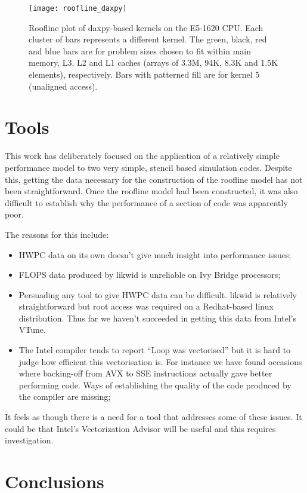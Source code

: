 \documentclass[12pt]{article}
\begin{document}
\begin{figure}
\texttt{[image: roofline\_daxpy]}
\caption{Roofline plot of daxpy-based kernels on the E5-1620 CPU. Each
  cluster of bars represents a different kernel. The green, black, red and
  blue bars are for problem sizes chosen to fit within main memory, L3, L2 and
  L1 caches (arrays of 3.3M, 94K, 8.3K and 1.5K elements),
  respectively. Bars with patterned fill are for kernel 5 (unaligned
  access).}
\label{FIG_daxpy_roofline}
\end{figure}

\section{Tools}

This work has deliberately focused on the application of a relatively
simple performance model to two very simple, stencil based simulation
codes.  Despite this, getting the data necessary for the construction
of the roofline model has not been straightforward. Once the roofline
model had been constructed, it was also difficult to establish why the
performance of a section of code was apparently poor.

The reasons for this include:
\begin{itemize}
\item HWPC data on its own doesn't give much insight into performance issues;
\item FLOPS data produced by likwid is unreliable on Ivy Bridge processors;
\item Persuading any tool to give HWPC data can be difficult. likwid
  is relatively straightforward but root access was required on a
  Redhat-based linux distribution. Thus far we haven't succeeded in
  getting this data from Intel's VTune.
\item The Intel compiler tends to report ``Loop was vectorised'' but
  it is hard to judge how efficient this vectorisation is. For
  instance we have found occasions where backing-off from AVX to SSE
  instructions actually gave better performing code. Ways of
  establishing the quality of the code produced by the compiler are
  missing;
\end{itemize}

It feels as though there is a need for a tool that addresses some of
these issues. It could be that Intel's Vectorization Advisor will be
useful and this requires investigation.


\section{Conclusions}



\end{document}
